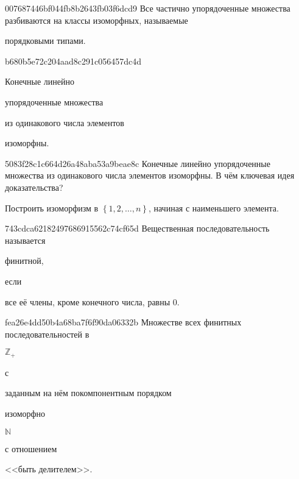 \begin{note}{007687446bf044fb8b2643fb03f6dcd9}
    Все частично упорядоченные множества разбиваются на классы изоморфных, называемые \begin{icloze}{1}порядковыми типами.\end{icloze}
\end{note}

\begin{note}{b680b5e72c204aad8c291c056457dc4d}
    \begin{icloze}{1}Конечные линейно\end{icloze} упорядоченные множества \begin{icloze}{2}из одинакового числа элементов\end{icloze} \begin{icloze}{3}изоморфны.\end{icloze}
\end{note}

\begin{note}{5083f28c1c664d26a48aba53a9beae8c}
    Конечные линейно упорядоченные множества из одинакового числа элементов изоморфны.
    В чём ключевая идея доказательства?

    \begin{cloze}{1}
        Построить изоморфизм в \({ \left\{ 1, 2, \ldots, n \right\} }\), начиная с наименьшего элемента.
    \end{cloze}
\end{note}

\begin{note}{743cdca62182497686915562c74cf65d}
    Вещественная последовательность называется \begin{icloze}{2}финитной,\end{icloze} если \begin{icloze}{1}все её члены, кроме конечного числа, равны \({ 0 }\).\end{icloze}
\end{note}

\begin{note}{fea26e4dd50b4a68ba7f6f90da06332b}
    Множестве всех финитных последовательностей в \begin{icloze}{4}\({ \mathbb Z_+ }\)\end{icloze} с \begin{icloze}{3}заданным на нём покомпонентным порядком\end{icloze} изоморфно \begin{icloze}{2}\({ \mathbb N }\)\end{icloze} с отношением \begin{icloze}{1}<<быть делителем>>.\end{icloze}
\end{note}

